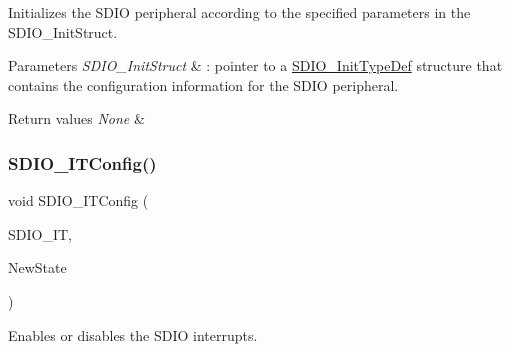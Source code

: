 Initializes the S\+D\+IO peripheral according to the specified parameters in the S\+D\+I\+O\+\_\+\+Init\+Struct. 


\begin{DoxyParams}{Parameters}
{\em S\+D\+I\+O\+\_\+\+Init\+Struct} & \+: pointer to a \mbox{\hyperlink{struct_s_d_i_o___init_type_def}{S\+D\+I\+O\+\_\+\+Init\+Type\+Def}} structure that contains the configuration information for the S\+D\+IO peripheral. \\
\hline
\end{DoxyParams}

\begin{DoxyRetVals}{Return values}
{\em None} & \\
\hline
\end{DoxyRetVals}
\mbox{\label{group___s_d_i_o___exported___functions_ga208f51237ef43288735829dbaed37f00}} 
\subsubsection{\texorpdfstring{SDIO\_ITConfig()}{SDIO\_ITConfig()}}
{\footnotesize\ttfamily void S\+D\+I\+O\+\_\+\+I\+T\+Config (\begin{DoxyParamCaption}\item[{uint32\+\_\+t}]{S\+D\+I\+O\+\_\+\+IT,  }\item[{\mbox{\hyperlink{group___exported__types_gac9a7e9a35d2513ec15c3b537aaa4fba1}{Functional\+State}}}]{New\+State }\end{DoxyParamCaption})}



Enables or disables the S\+D\+IO interrupts. 


